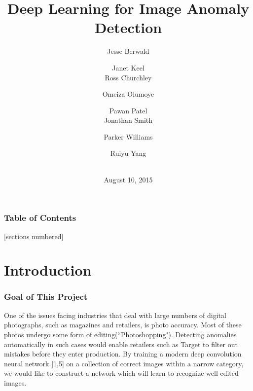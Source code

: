 \documentclass{beamer}
\title{Deep Learning for Image Anomaly Detection}
\date{August 10, 2015}
\author{Jesse Berwald \and Janet Keel \\ 
        Ross Churchley \and Omeiza Olumoye \and Pawan Patel \\ 
        Jonathan Smith \and Parker Williams \and Ruiyu Yang \\\\}
\begin{document}
\maketitle

\begin{frame}
  \frametitle{Table of Contents}
  [sections numbered]
  \tableofcontents[hideallsubsections]
\end{frame}

\section{Introduction}

\begin{frame}

    \frametitle{Goal of This Project}

	One of the issues facing industries that deal with large numbers of digital photographs, such as magazines and retailers, is photo accuracy. Most of these photos undergo some form of editing(``Photoshopping"). Detecting anomalies automatically in such cases would enable retailers such as Target to filter out mistakes before they enter production. By training a modern deep convolution neural network [1,5] on a collection of correct images within a narrow category, we would like to construct a network which will learn to recognize well-edited images. \\


\end{frame}
\end{document}
